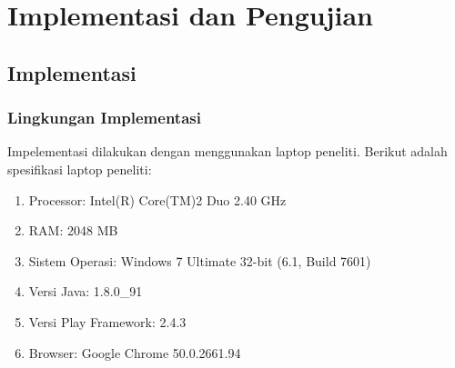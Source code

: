 \chapter{Implementasi dan Pengujian}
\label{chap:implementasipengujian}

\section{Implementasi}
\label{sec:implementasi}

\subsection{Lingkungan Implementasi}
\label{sec:lingkunganimplementasi}
Impelementasi dilakukan dengan menggunakan laptop peneliti. Berikut adalah spesifikasi laptop peneliti:
\begin{enumerate}
	\item Processor: Intel(R) Core(TM)2 Duo 2.40 GHz
	\item RAM: 2048 MB
	\item Sistem Operasi: Windows 7 Ultimate 32-bit (6.1, Build 7601)
	\item Versi Java: 1.8.0\_91
	\item Versi Play Framework: 2.4.3
	\item Browser: Google Chrome 50.0.2661.94
\end{enumerate}

